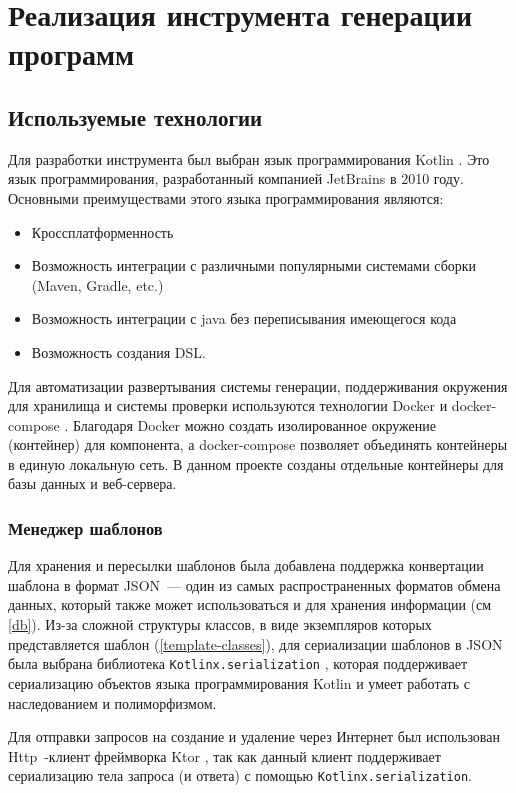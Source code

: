 \section{Реализация инструмента генерации программ}

\subsection{Используемые технологии}

Для разработки инструмента был выбран язык программирования Kotlin \cite{kotlin}. Это язык
программирования, разработанный компанией JetBrains в 2010 году. Основными
преимуществами этого языка программирования являются:
\begin{itemize}
    \item Кроссплатформенность
    \item Возможность интеграции с различными популярными системами сборки
          (Maven, Gradle, etc.)
    \item Возможность интеграции с java без переписывания имеющегося кода
    \item Возможность создания DSL.
\end{itemize}

Для автоматизации развертывания системы генерации, поддерживания окружения для хранилища и
системы проверки используются технологии Docker \cite{docker} и docker-compose \cite{docker-compose}.
Благодаря Docker можно создать изолированное окружение (контейнер) для компонента, а docker-compose
позволяет объединять контейнеры в единую локальную сеть. В данном проекте созданы отдельные
контейнеры для базы данных и веб-сервера.


\subsubsection{Менеджер шаблонов}
Для хранения и пересылки шаблонов была добавлена поддержка конвертации шаблона в формат JSON~---
один из самых распространенных форматов обмена данных, который также может использоваться и для
хранения информации (см \ref{db}). Из-за сложной структуры классов,
в виде экземпляров которых представляется шаблон (\ref{template-classes}), для сериализации шаблонов в
JSON была выбрана библиотека \texttt{Kotlinx.serialization} \cite{kotlinx-serialization},
которая поддерживает сериализацию объектов языка программирования Kotlin и умеет работать
с наследованием и полиморфизмом.

Для отправки запросов на создание и удаление через Интернет был использован
Http~-клиент фреймворка Ktor \cite{ktor}, так как данный клиент поддерживает
сериализацию тела запроса (и ответа) с помощью \texttt{Kotlinx.serialization}.

